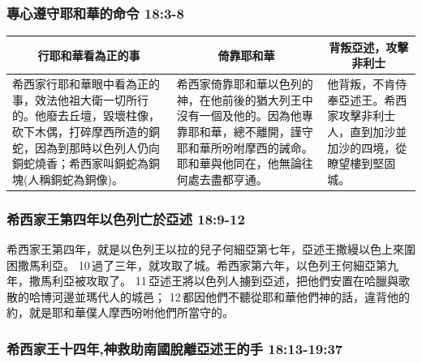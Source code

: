 \subsubsection{專心遵守耶和華的命令 18:3-8}
\begin{table}[H]
\centering
\begin{tabular}{p{6.5cm}|p{}|p{}}\hline\hline
\multicolumn{1}{c|}{行耶和華看為正的事}&\multicolumn{1}{c}{倚靠耶和華}&\multicolumn{1}{c}{背叛亞述，攻擊非利士}\\\hline
希西家行耶和華眼中看為正的事，效法他祖大衛一切所行的。他廢去丘壇，毀壞柱像，砍下木偶，打碎摩西所造的銅蛇，因為到那時以色列人仍向銅蛇燒香；希西家叫銅蛇為銅塊(人稱銅蛇為銅像)。
&希西家倚靠耶和華以色列的神，在他前後的猶大列王中沒有一個及他的。因為他專靠耶和華，總不離開，謹守耶和華所吩咐摩西的誡命。耶和華與他同在，他無論往何處去盡都亨通。
&他背叛，不肯侍奉亞述王。希西家攻擊非利士人，直到加沙並加沙的四境，從瞭望樓到堅固城。\\\hline
\end{tabular}
\end{table}




\subsubsection{希西家王第四年以色列亡於亞述 18:9-12}
希西家王第四年，就是以色列王以拉的兒子何細亞第七年，亞述王撒縵以色上來圍困撒馬利亞。 10 過了三年，就攻取了城。希西家第六年，以色列王何細亞第九年，撒馬利亞被攻取了。 11 亞述王將以色列人擄到亞述，把他們安置在哈臘與歌散的哈博河邊並瑪代人的城邑； 12 都因他們不聽從耶和華他們神的話，違背他的約，就是耶和華僕人摩西吩咐他們所當守的。

\subsubsection{希西家王十四年,神救助南國脫離亞述王的手 18:13-19:37}

